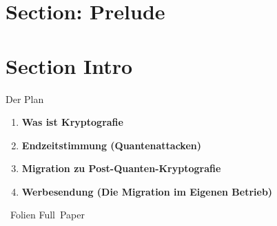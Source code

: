 \section{Section: Prelude}

\section{Section Intro}

\begin{frame}[c]{Der Plan}
  \small

  \begin{enumerate}
    \item \textbf{Was ist Kryptografie}
    \item \textbf{Endzeitstimmung (Quantenattacken)}
    \item \textbf{Migration zu Post-Quanten-Kryptografie}
    \item \textbf{Werbesendung (Die Migration im Eigenen Betrieb)}
  \end{enumerate}

	\vfill
	~Folien \hfill Full~Paper~

  \vfill
\end{frame}



